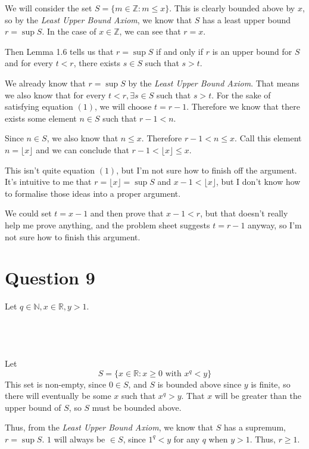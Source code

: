 \documentclass[a4paper]{article}
\begin{document}
We will consider the set $S = \{ m \in \mathbb Z : m \le x \}$. This is clearly bounded above by $x$, so by the \textit{Least Upper Bound Axiom}, we know that $S$ has a least upper bound $r = \sup S$. In the case of $x \in \mathbb Z$, we can see that $r = x$.

Then Lemma 1.6 tells us that $r = \sup S$ if and only if $r$ is an upper bound for $S$ and for every $t < r$, there exists $s \in S$ such that $s > t$.

We already know that $r = \sup S$ by the \textit{Least Upper Bound Axiom}. That means we also know that for every $t < r, \exists s \in S$ such that $s > t$. For the sake of satisfying equation $(1)$, we will choose $t = r - 1$. Therefore we know that there exists some element $n \in S$ such that $r - 1 < n$.

Since $n \in S$, we also know that $n \le x$. Therefore $r - 1 < n \le x$. Call this element $n = \lfloor x \rfloor$ and we can conclude that $r - 1 < \lfloor x \rfloor \le x$.

This isn't quite equation $(1)$, but I'm not sure how to finish off the argument. It's intuitive to me that $r = \lfloor x \rfloor = \sup S$ and $x - 1 < \lfloor x \rfloor$, but I don't know how to formalise those ideas into a proper argument.

We could set $t = x - 1$ and then prove that $x - 1 < r$, but that doesn't really help me prove anything, and the problem sheet suggests $t = r - 1$ anyway, so I'm not sure how to finish this argument.


\section*{Question 9}
\setcounter{section}{9}
\setcounter{subsection}{0}

Let $q \in \mathbb N, x \in \mathbb R, y > 1$.

\subsection{~}

Let $$S = \{x \in \mathbb R : x \ge 0 \text{ with } x^q < y\}$$
This set is non-empty, since $0 \in S$, and $S$ is bounded above since $y$ is finite, so there will eventually be some $x$ such that $x^q > y$. That $x$ will be greater than the upper bound of $S$, so $S$ must be bounded above.

Thus, from the \textit{Least Upper Bound Axiom}, we know that $S$ has a supremum, $r = \sup S$. $1$ will always be $\in S$, since $1^q < y$ for any $q$ when $y > 1$. Thus, $r \ge 1$.
\end{document}
